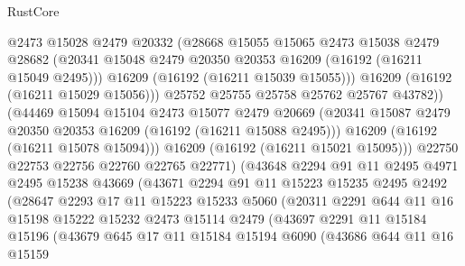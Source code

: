 \begin{lexlean}{RustCore}
\begin{coremodule}
                      @2473
                      @15028
                      @2479
                      @20332
                      (@28668
                        @15055
                        @15065
                        @2473
                        @15038
                        @2479
                        @28682
                        (@20341 @15048 @2479 @20350 @20353 @16209 (@16192 (@16211 @15049 @2495)))
                        @16209
                        (@16192 (@16211 @15039 @15055)))
                      @16209
                      (@16192 (@16211 @15029 @15056)))
                    @25752
                    @25755
                    @25758
                    @25762
                    @25767
                    @43782))
                (@44469
                  @15094
                  @15104
                  @2473
                  @15077
                  @2479
                  @20669
                  (@20341 @15087 @2479 @20350 @20353 @16209 (@16192 (@16211 @15088 @2495)))
                  @16209
                  (@16192 (@16211 @15078 @15094)))
                @16209
                (@16192 (@16211 @15021 @15095)))
              @22750
              @22753
              @22756
              @22760
              @22765
              @22771)
            (@43648
              @2294
              @91
              @11
              @2495
              @4971
              @2495
              @15238
              @43669
              (@43671
                @2294
                @91
                @11
                @15223
                @15235
                @2495
                @2492
                (@28647
                  @2293
                  @17
                  @11
                  @15223
                  @15233
                  @5060
                  (@20311
                    @2291
                    @644
                    @11
                    @16
                    @15198
                    @15222
                    @15232
                    @2473
                    @15114
                    @2479
                    (@43697
                      @2291
                      @11
                      @15184
                      @15196
                      (@43679
                        @645
                        @17
                        @11
                        @15184
                        @15194
                        @6090
                        (@43686
                          @644
                          @11
                          @16
                          @15159

\end{coremodule}
\end{lexlean}
